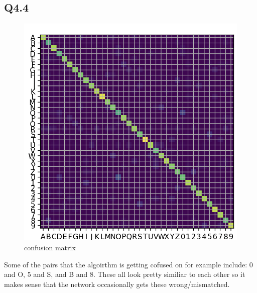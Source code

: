 \documentclass{article}
\begin{document}
\subsection*{Q4.4}
\begin{figure}[htbp]
    \centering
    \includegraphics[width=0.9\linewidth]{confusion_matrix.png}
    \caption{confusion matrix}
  \end{figure}
\begin{flushleft}
    Some of the pairs that the algoirthm is getting cofused on for example include:
    0 and O, 5 and S, and B and 8. These all look pretty similiar to each other so it makes 
    sense that the network occasionally gets these wrong/mismatched.
\end{flushleft}
\newpage
\end{document}
